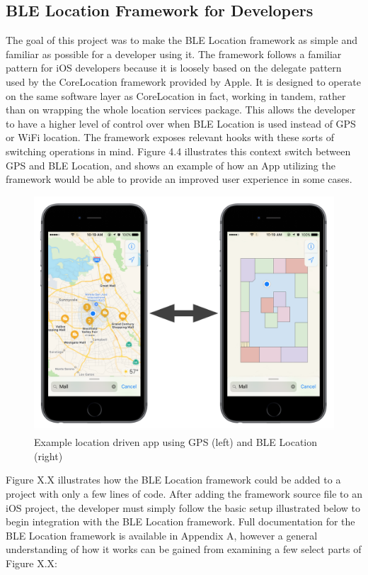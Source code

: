 \subsection{BLE Location Framework for Developers}
The goal of this project was to make the BLE Location framework as simple and familiar as possible for a developer using it.  The framework follows a familiar pattern for iOS developers because it is loosely based on the delegate pattern used by the CoreLocation framework provided by Apple.  It is designed to operate on the same software layer as CoreLocation in fact, working in tandem, rather than on wrapping the whole location services package.  This allows the developer to have a higher level of control over when BLE Location is used instead of GPS or WiFi location.  The framework exposes relevant hooks with these sorts of switching operations in mind.  Figure 4.4 illustrates this context switch between GPS and BLE Location, and shows an example of how an App utilizing the framework would be able to provide an improved user experience in some cases.
\begin{figure}[h]
\includegraphics[width=1\textwidth]{images/compare.png}
\caption{Example location driven app using GPS (left) and BLE Location (right)}
\end{figure}

Figure X.X illustrates how the BLE Location framework could be added to a project with only a few lines of code.  After adding the framework source file to an iOS project, the developer must simply follow the basic setup illustrated below to begin integration with the BLE Location framework.  Full documentation for the BLE Location framework is available in Appendix A, however a general understanding of how it works can be gained from examining a few select parts of Figure X.X:

